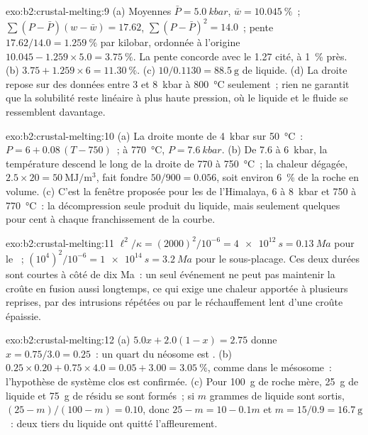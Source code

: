 \begin{solution}{exo:b2:crustal-melting:9}
(a) Moyennes $\bar P = \qty{5.0}{kbar}$, $\bar w = \qty{10.045}{\percent}$~;
$\sum(P - \bar P)(w - \bar w) = 17.62$, $\sum(P - \bar P)^2 = 14.0$~; pente
$17.62/14.0 = \qty{1.259}{\percent}$ par kilobar, ordonnée à l'origine $10.045 - 1.259\times5.0 =
\qty{3.75}{\percent}$. La pente concorde avec le 1.27 cité, à
\qty{1}{\percent} près. (b) $3.75 + 1.259\times6 = \qty{11.30}{\percent}$. (c) $10/0.1130 =
\qty{88.5}{\gram}$ de liquide. (d) La droite repose sur des données entre 3 et \qty{8}{kbar} à
\qty{800}{\celsius} seulement~; rien ne garantit que la solubilité reste linéaire à plus haute
pression, où le liquide et le fluide se ressemblent davantage.
\end{solution}

\begin{solution}{exo:b2:crustal-melting:10}
(a) La droite monte de \qty{4}{kbar} sur \qty{50}{\celsius}~: $P = 6 + 0.08\,(T - 750)$~;
à \qty{770}{\celsius}, $P = \qty{7.6}{kbar}$. (b) De 7.6 à \qty{6}{kbar}, la température descend le long de la droite de 770 à
\qty{750}{\celsius}~; la chaleur dégagée, $2.5\times20 = \qty{50}{\mega\joule\per\cubic\metre}$,
fait fondre $50/900 = 0.056$, soit environ
\qty{6}{\percent} de la roche en volume. (c) C'est la fenêtre proposée pour les
 de l'Himalaya, 6 à \qty{8}{kbar} et 750 à \qty{770}{\celsius}~: la décompression
seule produit du liquide, mais seulement quelques pour cent à chaque franchissement de la courbe.
\end{solution}

\begin{solution}{exo:b2:crustal-melting:11}
$\ell^2/\kappa = (2000)^2/10^{-6} = \qty{4e12}{s} = \qty{0.13}{Ma}$ pour le ~;
$(10^4)^2/10^{-6} = \qty{1e14}{s} = \qty{3.2}{Ma}$ pour le sous-placage. Ces deux durées sont courtes
à côté de dix Ma~: un seul événement ne peut pas maintenir la croûte en fusion aussi longtemps, ce qui exige une chaleur
apportée à plusieurs reprises, par des intrusions répétées ou par le réchauffement lent d'une
croûte épaissie.
\end{solution}

\begin{solution}{exo:b2:crustal-melting:12}
(a) $5.0x + 2.0(1 - x) = 2.75$ donne $x = 0.75/3.0 = 0.25$~: un quart du néosome est
. (b) $0.25\times0.20 + 0.75\times4.0 = 0.05 + 3.00 = \qty{3.05}{\percent}$, comme
dans le mésosome~: l'hypothèse de système clos est confirmée. (c) Pour \qty{100}{\gram} de
roche mère, \qty{25}{\gram} de liquide et \qty{75}{\gram} de résidu se sont formés~; si $m$ grammes de
liquide sont sortis, $(25 - m)/(100 - m) = 0.10$, donc $25 - m = 10 - 0.1m$ et $m = 15/0.9 =
\qty{16.7}{\gram}$~: deux tiers du liquide ont quitté l'affleurement.
\end{solution}

